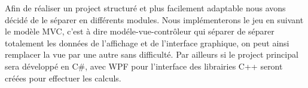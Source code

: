 Afin de réaliser un project structuré et plus facilement adaptable nous avons décidé de le séparer en différents modules. Nous implémenterons le jeu en suivant le modèle MVC, c'est à dire modéle-vue-contrôleur qui séparer de séparer totalement les données de l'affichage et de l'interface graphique, on peut ainsi remplacer la vue par une autre sans difficulté. Par ailleurs si le project principal sera développé en C\#, avec WPF pour l'interface des librairies C++ seront créées pour effectuer les calculs.